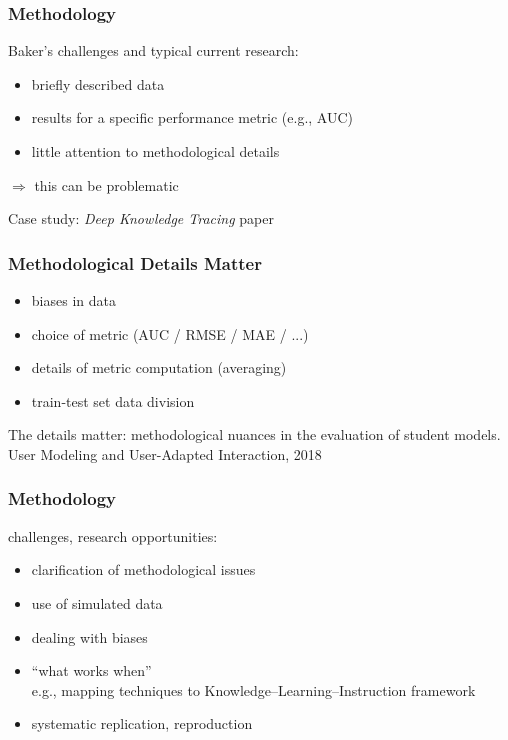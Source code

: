 \documentclass[bigger]{beamer}
\begin{document}
\begin{frame}
  \frametitle{Methodology}

  Baker's challenges and typical current research:
  \begin{itemize}
  \item briefly described data
  \item results for a specific performance metric (e.g., AUC)
  \item little attention to methodological details
  \end{itemize}
  
  \bigskip

  $\Rightarrow$ this can be problematic

  \bigskip
  
  Case study: \emph{Deep Knowledge Tracing} paper
\end{frame}

\begin{frame}
  \frametitle{Methodological Details Matter}

  \begin{itemize}
  \item biases in data
  \item choice of metric (AUC / RMSE / MAE / ...)
  \item details of metric computation (averaging)
  \item train-test set data division
  \end{itemize}

  \bigskip

  {\color{gray} \footnotesize The details matter: methodological nuances in the evaluation of student
    models. User Modeling and User-Adapted Interaction, 2018}
\end{frame}

\begin{frame}
  \frametitle{Methodology}

  challenges, research opportunities:
  \begin{itemize}
  \item clarification of methodological issues
  \item use of simulated data
  \item dealing with biases
  \item ``what works when''\\
    {\small e.g., mapping techniques to Knowledge--Learning--Instruction framework}
  \item systematic replication, reproduction
  \end{itemize}
\end{frame}
\end{document}
